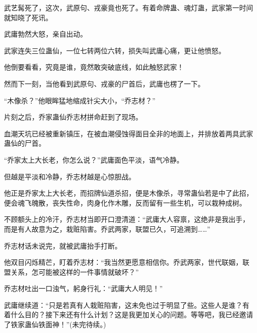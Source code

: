 \begin{this_body}
武艺髯死了，这次，武原句、戎豪竟也死了。有着命牌蛊、魂灯蛊，武家第一时间就知晓了死讯。

武庸勃然大怒，亲自出动。

武家连失三位蛊仙，一位七转两位六转，损失叫武庸心痛，更让他愤怒。

他倒要看看，究竟是谁，竟然敢突破底线，如此触怒武家！

然而下一刻，当他看到武原句、戎豪的尸首后，武庸也楞了一下。

“木像杀？”他眼眸猛地缩成针尖大小，“乔志材？”

片刻之后，乔家蛊仙乔志材拼命赶到了现场。

血潮天坑已经被重新镇压，在被血潮侵蚀得面目全非的地面上，并排放着两具武家蛊仙的尸首。

“乔家太上大长老，你怎么说？”武庸面色平淡，语气冷静。

但越是平淡和冷静，乔志材越是心惊胆战。

他正是乔家太上大长老，而招牌仙道杀招，便是木像杀，寻常蛊仙若是中了此招，便会魂飞魄散，丧失性命，肉身化作木雕，反而留有一些生机，可以栽种成树。

不顾额头上的冷汗，乔志材当即开口澄清道：“武庸大人容禀，这绝非是我出手，而是有人故意为之，栽赃陷害。乔武两家，联盟已久，可追溯到……”

乔志材话未说完，就被武庸抬手打断。

他双目闪烁精芒，盯着乔志材：“我当然更愿意相信你。乔武两家，世代联姻，联盟关系，怎可能被这样的一件事情就破坏？”

乔志材吐出一口浊气，躬身行礼：“武庸大人明见！”

武庸继续道：“只是若真有人栽赃陷害，这未免也过于明显了些。这些人是谁？有着什么目的？接下来还有什么计划？这是我更加关心的问题。等等吧，我已经邀请了铁家蛊仙铁面神！”(未完待续。)

\end{this_body}

